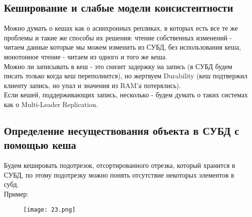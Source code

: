    \subsection{Кеширование и слабые модели консистентности}
    Можно думать о кешах как о асинхронных репликах, в которых есть все те же проблемы и такие же способы их решения: чтение собственных изменений - читаем данные которые мы можем изменить из СУБД, без использования кеша, монотонное чтение - читаем из одного и того же кеша. \\
    Можно ли записывать в кеш - это снизит задержку на запись (в СУБД будем писать только когда кеш переполнится), но жертвуем Durability (кеш подтвержил клиенту запись, но упал и значения из RAM'а потерялись).\\
    Если кешей, поддерживающих запись, несколько - будем думать о таких системах как о Multi-Leader Replication. \\
    \subsection{Определение несуществования объекта в СУБД с помощью кеша}
    Будем кешировать подотрезок, отсортированного отрезка, который хранится в СУБД, по этому подотрезку можно понять отсутствие некоторых элементов в субд.\\
    Пример:\\
    \begin{figure}[h]
        \centering
        \texttt{[image: 23.png]}
        \caption{}
    \end{figure}
